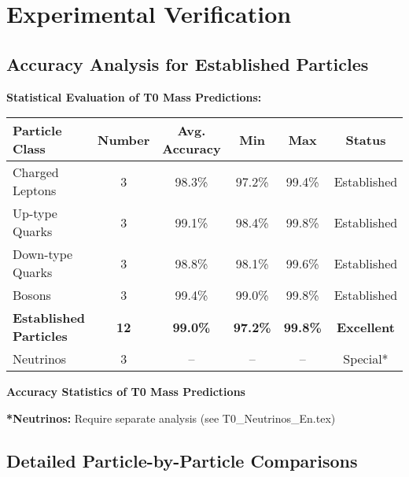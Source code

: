 \documentclass[12pt,a4paper]{article}
\begin{document}
	\section{Experimental Verification}
	
	\subsection{Accuracy Analysis for Established Particles}
	
	\begin{experimental}
		\textbf{Statistical Evaluation of T0 Mass Predictions:}
		
		\begin{center}
			\begin{tabular}{lccccc}
				\toprule
				\textbf{Particle Class} & \textbf{Number} & \textbf{Avg. Accuracy} & \textbf{Min} & \textbf{Max} & \textbf{Status} \\
				\midrule
				Charged Leptons & 3 & 98.3\% & 97.2\% & 99.4\% & Established \\
				Up-type Quarks & 3 & 99.1\% & 98.4\% & 99.8\% & Established \\
				Down-type Quarks & 3 & 98.8\% & 98.1\% & 99.6\% & Established \\
				Bosons & 3 & 99.4\% & 99.0\% & 99.8\% & Established \\
				\midrule
				\textbf{Established Particles} & \textbf{12} & \textbf{99.0\%} & \textbf{97.2\%} & \textbf{99.8\%} & \textbf{Excellent} \\
				\midrule
				Neutrinos & 3 & -- & -- & -- & Special* \\
				\bottomrule
			\end{tabular}
		\end{center}
		\textbf{Accuracy Statistics of T0 Mass Predictions}
		
		\textbf{*Neutrinos:} Require separate analysis (see T0\_Neutrinos\_En.tex)
	\end{experimental}
	
	\subsection{Detailed Particle-by-Particle Comparisons}
	
\end{document}
